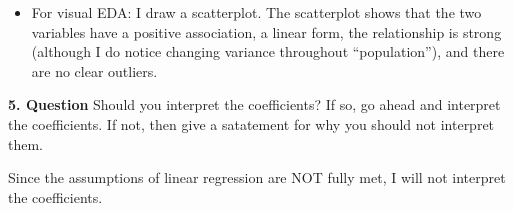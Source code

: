 \documentclass[
]{article}
\providecommand{\tightlist}{%
  \setlength{\itemsep}{0pt}\setlength{\parskip}{0pt}}
\begin{document}
\begin{itemize}
\tightlist
\item
  For visual EDA: I draw a scatterplot. The scatterplot shows that the
  two variables have a positive association, a linear form, the
  relationship is strong (although I do notice changing variance
  throughout ``population''), and there are no clear outliers.
\end{itemize}

\textbf{5. Question} Should you interpret the coefficients? If so, go
ahead and interpret the coefficients. If not, then give a satatement for
why you should not interpret them.

Since the assumptions of linear regression are NOT fully met, I will not
interpret the coefficients.
\end{document}
